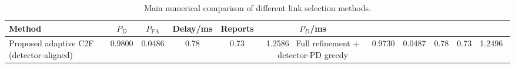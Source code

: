 \begin{table}[t]
    \centering
    \caption{Main numerical comparison of different link selection methods.}
    \label{tab:main_summary}
    \begin{tabular}{l c c c c c}
        \hline
        Method & $P_D$ & $P_{\mathrm{FA}}$ & Delay/ms & Reports & $P_D$/ms \\
        \hline
        Proposed adaptive C2F (detector-aligned) & 0.9800 & 0.0486 & 0.78 & 0.73 & 1.2586 \
        Full refinement + detector-PD greedy & 0.9730 & 0.0487 & 0.78 & 0.73 & 1.2496 \
        \hline
    \end{tabular}
\end{table}
